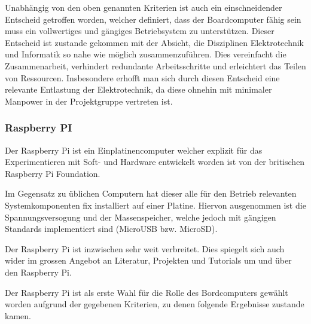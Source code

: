 Unabhängig von den oben genannten Kriterien ist auch ein einschneidender
Entscheid getroffen worden, welcher definiert, dass der Boardcomputer
fähig sein muss ein vollwertiges und gängiges Betriebsystem zu 
unterstützen. Dieser Entscheid ist zustande gekommen mit der Absicht, die
Disziplinen Elektrotechnik und Informatik so nahe wie möglich 
zusammenzuführen. Dies vereinfacht die Zusammenarbeit, verhindert 
redundante Arbeitsschritte und erleichtert das Teilen von Ressourcen.
Insbesondere erhofft man sich durch diesen Entscheid eine relevante 
Entlastung der Elektrotechnik, da diese ohnehin mit minimaler Manpower in
der Projektgruppe vertreten ist.

\subsubsection{Raspberry PI}
Der Raspberry Pi ist ein Einplatinencomputer welcher explizit für
das Experimentieren mit Soft- und Hardware entwickelt worden ist von
der britischen Raspberry Pi Foundation.

Im Gegensatz zu üblichen Computern hat dieser alle für den Betrieb
relevanten Systemkomponenten fix installiert auf einer Platine. Hiervon
ausgenommen ist die Spannungsversogung und der Massenspeicher, welche
jedoch mit gängigen Standards implementiert sind (MicroUSB bzw. MicroSD).

Der Raspberry Pi ist inzwischen sehr weit verbreitet. Dies spiegelt sich
auch wider im grossen Angebot an Literatur, Projekten und Tutorials um
und über den Raspberry Pi.

Der Raspberry Pi ist als erste Wahl für die Rolle des Bordcomputers 
gewählt worden aufgrund der gegebenen Kriterien, zu denen folgende 
Ergebnisse zustande kamen.

